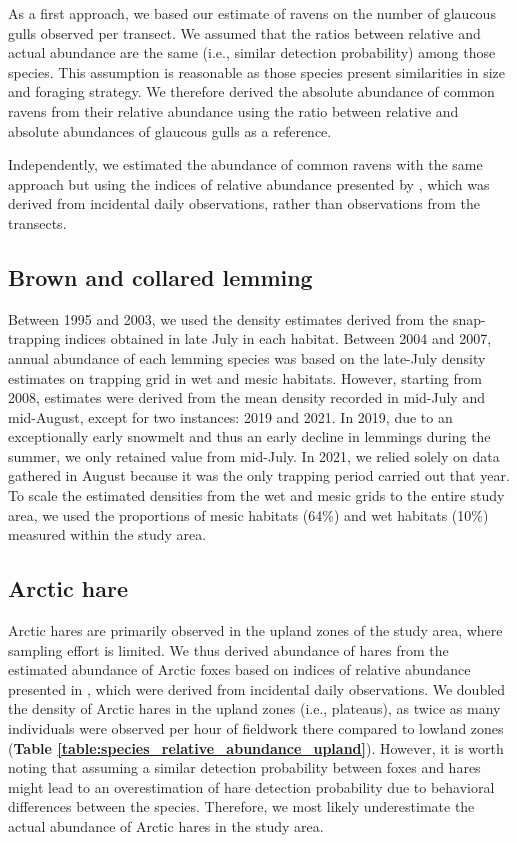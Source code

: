 \documentclass[a4paper,twoside,10pt]{article}
\begin{document}
As a first approach, we based our estimate of ravens on the number of glaucous gulls observed per transect. We assumed that the ratios between relative and actual abundance are the same (i.e., similar detection probability) among those species. This assumption is reasonable as those species present similarities in size and foraging strategy. We therefore derived the absolute abundance of common ravens from their relative abundance using the ratio between relative and absolute abundances of glaucous gulls as a reference.  

Independently, we estimated the abundance of common ravens with the same approach but using the indices of relative abundance presented by \citet{gauthier2024a}, which was derived from incidental daily observations, rather than observations from the transects.

\subsection{Brown and collared lemming}
Between 1995 and 2003, we used the density estimates derived from the snap-trapping indices obtained in late July in each habitat. Between 2004 and 2007, annual abundance of each lemming species was based on the late-July density estimates on trapping grid in wet and mesic habitats. However, starting from 2008, estimates were derived from the mean density recorded in mid-July and mid-August, except for two instances: 2019 and 2021. In 2019, due to an exceptionally early snowmelt and thus an early decline in lemmings during the summer, we only retained value from mid-July. In 2021, we relied solely on data gathered in August because it was the only trapping period carried out that year. To scale the estimated densities from the wet and mesic grids to the entire study area, we used the proportions of mesic habitats (64\%) and wet habitats (10\%) measured within the study area. 


\subsection{Arctic hare}
Arctic hares are primarily observed in the upland zones of the study area, where sampling effort is limited. We thus derived abundance of hares from the estimated abundance of Arctic foxes based on indices of relative abundance presented in \citep{gauthier2024a}, which were derived from incidental daily observations. We doubled the density of Arctic hares in the upland zones (i.e., plateaus), as twice as many individuals were observed per hour of fieldwork there compared to lowland zones (\textbf{Table \ref{table:species_relative_abundance_upland}}). However, it is worth noting that assuming a similar detection probability between foxes and hares might lead to an overestimation of hare detection probability due to behavioral differences between the species. Therefore, we most likely underestimate the actual abundance of Arctic hares in the study area.
\end{document}
